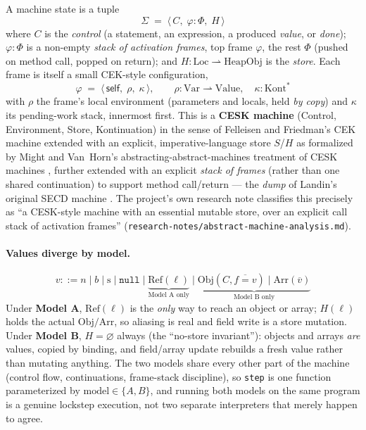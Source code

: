 \documentclass[11pt]{article}
\begin{document}
A machine state is a tuple
\[
  \Sigma \;=\; \langle\, C,\; \varphi\!:\!\Phi,\; H \,\rangle
\]
where $C$ is the \emph{control} (a statement, an expression, a produced
\emph{value}, or \emph{done}); $\varphi\!:\!\Phi$ is a non-empty
\emph{stack of activation frames}, top frame $\varphi$, the rest $\Phi$
(pushed on method call, popped on return); and $H : \mathrm{Loc} \rightharpoonup
\mathrm{HeapObj}$ is the \emph{store}. Each frame is itself a small
CEK-style configuration,
\[
  \varphi \;=\; \langle\, \mathsf{self},\; \rho,\; \kappa \,\rangle,
  \qquad \rho : \mathrm{Var} \rightharpoonup \mathrm{Value}, \quad
  \kappa : \mathrm{Kont}^{*}
\]
with $\rho$ the frame's local environment (parameters and locals, held
\emph{by copy}) and $\kappa$ its pending-work stack, innermost first. This
is a \textbf{CESK machine} (Control, Environment, Store, Kontinuation) in
the sense of Felleisen and Friedman's CEK machine
\cite{felleisen1986control} extended with an explicit, imperative-language
store $S$/$H$ as formalized by Might and Van~Horn's abstracting-abstract-machines
treatment of CESK machines \cite{mightvanhorn2010aam}, further extended with
an explicit \emph{stack of frames} (rather than one shared continuation) to
support method call/return --- the \emph{dump} of Landin's original SECD
machine \cite{landin1964scpp}. The project's own research note classifies
this precisely as ``a CESK-style machine with an essential mutable store,
over an explicit call stack of activation frames''
(\texttt{research-notes/abstract-machine-analysis.md}).

\paragraph{Values diverge by model.}
\[
  v ::= n \mid b \mid \mathrm{s} \mid \mathtt{null}
      \mid \underbrace{\mathrm{Ref}(\ell)}_{\text{Model A only}}
      \mid \underbrace{\mathrm{Obj}(C,\overline{f{=}v}) \mid \mathrm{Arr}(\overline{v})}_{\text{Model B only}}
\]
Under \textbf{Model A}, $\mathrm{Ref}(\ell)$ is the \emph{only} way to reach
an object or array; $H(\ell)$ holds the actual $\mathrm{Obj}/\mathrm{Arr}$,
so aliasing is real and field write is a store mutation. Under
\textbf{Model B}, $H = \varnothing$ always (the ``no-store invariant''):
objects and arrays \emph{are} values, copied by binding, and field/array
update rebuilds a fresh value rather than mutating anything. The two models
share every other part of the machine (control flow, continuations,
frame-stack discipline), so \texttt{step} is one function parameterized by
$\mathrm{model} \in \{A,B\}$, and running both models on the same program
is a genuine lockstep execution, not two separate interpreters that merely
happen to agree.
\end{document}
